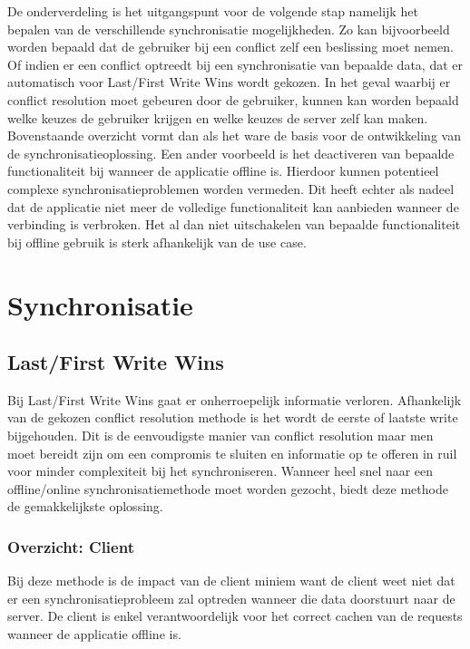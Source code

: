 De onderverdeling is het uitgangspunt voor de volgende stap namelijk het bepalen van de verschillende synchronisatie mogelijkheden. Zo kan bijvoorbeeld worden bepaald dat de gebruiker bij een conflict zelf een beslissing moet nemen. Of indien er een conflict optreedt bij een synchronisatie van bepaalde data, dat er automatisch voor Last/First Write Wins wordt gekozen. In het geval waarbij er conflict resolution moet gebeuren door de gebruiker, kunnen kan worden bepaald welke keuzes de gebruiker krijgen en welke keuzes de server zelf kan maken. Bovenstaande overzicht vormt dan als het ware de basis voor de ontwikkeling van de synchronisatieoplossing. Een ander voorbeeld is het deactiveren van bepaalde functionaliteit bij wanneer de applicatie offline is. Hierdoor kunnen potentieel complexe synchronisatieproblemen worden vermeden. Dit heeft echter als nadeel dat de applicatie niet meer de volledige functionaliteit kan aanbieden wanneer de verbinding is verbroken. Het al dan niet uitschakelen van bepaalde functionaliteit bij offline gebruik is sterk afhankelijk van de use case.

\section{Synchronisatie}
\subsection{Last/First Write Wins}
Bij Last/First Write Wins gaat er onherroepelijk informatie verloren. Afhankelijk van de gekozen conflict resolution methode is het wordt de eerste of laatste write bijgehouden. Dit is de eenvoudigste manier van conflict resolution maar men moet bereidt zijn om een compromis te sluiten en informatie op te offeren in ruil voor minder complexiteit bij het synchroniseren. Wanneer heel snel naar een offline/online synchronisatiemethode moet worden gezocht, biedt deze methode de gemakkelijkste oplossing.
\subsubsection{Overzicht: Client}
Bij deze methode is de impact van de client miniem want de client weet niet dat er een synchronisatieprobleem zal optreden wanneer die data doorstuurt naar de server. De client is enkel verantwoordelijk voor het correct cachen van de requests wanneer de applicatie offline is.
